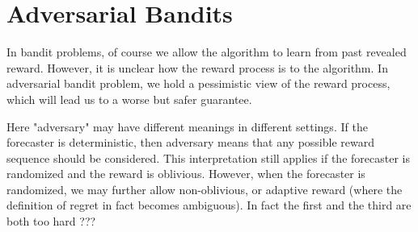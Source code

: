 \documentclass[openany]{book}
\newtheorem{theorem}{Theorem}[chapter]
\theoremstyle{definition}
\theoremstyle{remark}
\begin{document}
\begin{comment}
\section{Thompson Sampling}
The Thompson sampling method is a Bayesian method. Suppose for each arm $1\le i\le K$, $\nu_i$ is a Bernoulli distribution with mean $\mu_i$. We give a uniform prior to every $\mu_i$, and let $\nu_{i,t}$ denote the posterior distribution of $\mu_i$ after $t$ steps and $\theta_{i,t}$ denote a sample from $\nu_{i,t}$. The Thompson sampling method just chooses
\begin{equation}
    i_t\in\arg\max_{1\le i\le K}\theta_{i,t}.
\end{equation}

The Thompson sampling method is also asympototically optimal:
\begin{theorem}[\cite{KKM12} Theorem 1]
    For every $\epsilon>0$, there exists a constant $C(\epsilon,\mu_1,\ldots,\mu_K)$ such that the regret of Thompson sampling satisfies
    \begin{equation}\label{ThompsonBound}
        \overline{\mathrm{Regret}(T)}\le(1+\epsilon)\sum_{i|\Delta_i>0}^{}\frac{\Delta_i}{D_{\mathrm{KL}}(\nu_i\Vert\nu^*)}(\ln T+\ln\ln T)+C(\epsilon,\mu_1,\ldots,\mu_K).
    \end{equation}
\end{theorem}

Also, in \cite{KKM12} it is claimed that the empirical performance of Thompson sampling is better than KL-UCB, and much better than UCB.
\end{comment}

\chapter{Adversarial Bandits}
In bandit problems, of course we allow the algorithm to learn from past revealed reward. However, it is unclear how the reward process is to the algorithm. In adversarial bandit problem, we hold a pessimistic view of the reward process, which will lead us to a worse but safer guarantee.

Here "adversary" may have different meanings in different settings. If the forecaster is deterministic, then adversary means that any possible reward sequence should be considered. This interpretation still applies if the forecaster is randomized and the reward is oblivious. However, when the forecaster is randomized, we may further allow non-oblivious, or adaptive reward (where the definition of regret in fact becomes ambiguous). In fact the first and the third are both too hard ???
\end{document}
